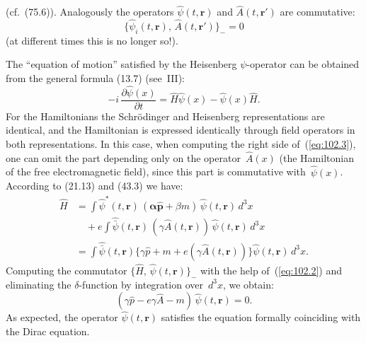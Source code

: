 
\noindent (cf.~(75.6)). Analogously the operators $\hat{\psi}(t, \mathbf{r})$ and $\hat{A}(t, \mathbf{r}')$ are commutative:
\[
\bigl\{\hat{\psi}_i(t, \mathbf{r}),\, \hat{A}(t, \mathbf{r}')\bigr\}_- = 0
\]
(at different times this is no longer so!).

The ``equation of motion'' satisfied by the Heisenberg $\psi$-operator can be obtained from the general formula (13.7) (see~III):
\begin{equation}
-i\,\frac{\partial\hat{\psi}(x)}{\partial t} = \hat{H}\hat{\psi}(x) - \hat{\psi}(x)\hat{H}.
\label{eq:102.3}
\end{equation}
For the Hamiltonians the Schr\"odinger and Heisenberg representations are identical, and the Hamiltonian is expressed identically through field operators in both representations. In this case, when computing the right side of~(\ref{eq:102.3}), one can omit the part depending only on the operator~$\hat{A}(x)$ (the Hamiltonian of the free electromagnetic field), since this part is commutative with~$\hat{\psi}(x)$. According to (21.13) and (43.3) we have:
\begin{equation}
\begin{split}
\hat{H} &= \int \hat{\psi}^*(t, \mathbf{r})\,(\boldsymbol{\alpha}\hat{\mathbf{p}} + \beta m)\,\hat{\psi}(t, \mathbf{r})\,d^3x \\
&\quad + e\int \hat{\bar{\psi}}(t, \mathbf{r})\,(\gamma\hat{A}(t, \mathbf{r}))\,\hat{\psi}(t, \mathbf{r})\,d^3x \\
&= \int \hat{\bar{\psi}}(t, \mathbf{r})\bigl\{\gamma\hat{p} + m + e(\gamma\hat{A}(t, \mathbf{r}))\bigr\}\hat{\psi}(t, \mathbf{r})\,d^3x.
\end{split}
\label{eq:102.4}
\end{equation}
Computing the commutator $\{\hat{H},\, \hat{\psi}(t, \mathbf{r})\}_-$ with the help of~(\ref{eq:102.2}) and eliminating the $\delta$-function by integration over~$d^3x$, we obtain:
\begin{equation}
(\gamma\hat{p} - e\gamma\hat{A} - m)\,\hat{\psi}(t, \mathbf{r}) = 0.
\label{eq:102.5}
\end{equation}
As expected, the operator $\hat{\psi}(t, \mathbf{r})$ satisfies the equation formally coinciding with the Dirac equation.

